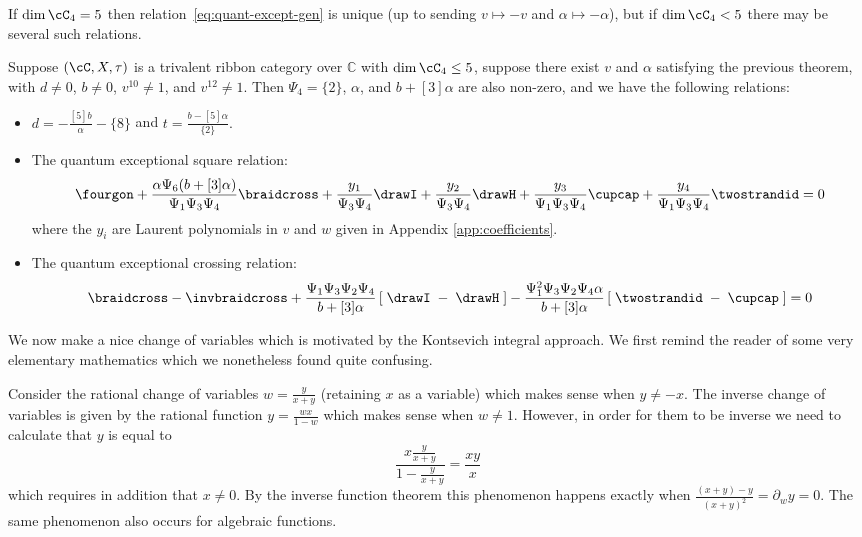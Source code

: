 \documentclass[12pt]{amsart}
\begin{document}
If $\dim{\cC_4} = 5$ then relation~\eqref{eq:quant-except-gen} is
unique (up to sending $v \mapsto -v$ and $\alpha \mapsto -\alpha$),
but if $\dim{\cC_4} < 5$ there may be several such relations.

\begin{theorem}\label{thm:square-crossing}
Suppose $(\cC, X, \tau)$ is a trivalent ribbon category over $\mathbb{C}$ with
$\dim{\cC_4} \leq 5$, suppose there exist $v$ and $\alpha$ satisfying the
previous theorem, with $d \neq 0 $, $b \neq 0$, $v^{10} \neq 1$, and $v^{12}
\neq 1$.  Then $\Psi_4 = \{2\}$, $\alpha$, and $b+[3]\alpha$ are
also non-zero, and we have the following relations:
\begin{itemize}
\item
$
  d = -\frac{[5] b}{\alpha} - \{8\} 
$
and
$
  t = \frac{b-[5] \alpha}{\{2\}}.
$
\item

The quantum exceptional square relation:
\begin{equation*} \fourgon + \frac{\alpha \Psi_6 (b+[3]\alpha)}{\Psi_1 \Psi_3 \Psi_4}  \braidcross + \frac{y_1}{\Psi_3 \Psi_4}  \drawI + \frac{y_2}{\Psi_3 \Psi_4}  \drawH + \frac{y_3}{\Psi_1 \Psi_3 \Psi_4} \cupcap + \frac{y_4}{\Psi_1 \Psi_3 \Psi_4} \twostrandid =0
\end{equation*}
where the $y_i$ are Laurent polynomials in $v$ and $w$ given in Appendix \ref{app:coefficients}.
\item
The quantum exceptional crossing relation:
\begin{equation*}
\braidcross - \invbraidcross + \frac{\Psi_1 \Psi_3 \Psi_2 \Psi_4}{b+[3]\alpha} \left[\; \drawI \; - \; \drawH \; \right] - \frac{\Psi_1^2 \Psi_3 \Psi_2 \Psi_4 \alpha}{b+[3]\alpha} \left[\; \twostrandid \; - \; \cupcap \; \right] = 0
\end{equation*}
\end{itemize}

\end{theorem}

We now make a nice change of variables which is motivated by the Kontsevich integral approach.  We first remind the reader of some very elementary mathematics which we nonetheless found quite confusing.

\begin{remark}
Consider the rational change of variables $w= \frac{y}{x+y}$ (retaining $x$ as a variable) which makes sense when $y \neq -x$.  The inverse change of variables is given by the rational function $y = \frac{wx}{1-w}$ which makes sense when $w \neq 1$.  However, in order for them to be inverse we need to calculate that $y$ is equal to
$$\frac{x\frac{y}{x+y}}{1-\frac{y}{x+y}} = \frac{xy}{x}$$ which requires in addition that $x \neq 0$.  By the inverse function theorem this phenomenon happens exactly when $\frac{(x+y)-y}{(x+y)^2} = \partial_w y = 0$.  The same phenomenon also occurs for algebraic functions.
\end{remark}
\end{document}
